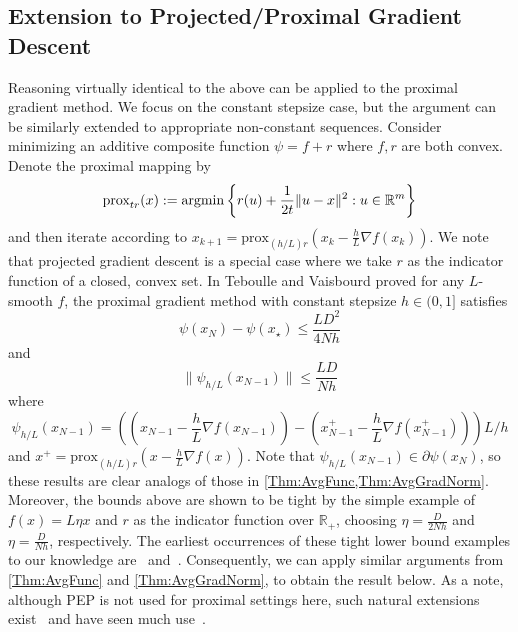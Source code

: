 \documentclass[11pt]{article}
\numberwithin{equation}{section}
\newcommand{\R}{\mathbb{R}}
\newcommand{\prox}{\text{prox}}
\newcommand{\argmin}{\operatornamewithlimits{argmin}}
\theoremstyle{definition}
\theoremstyle{definition}
\theoremstyle{definition}
\newcommand{\1}{\mathbf{1}}
\newcommand{\xStar}{x_\star}
\newcommand{\dimension}{m}
\begin{document}
\subsection{Extension to Projected/Proximal Gradient Descent}
    Reasoning virtually identical to the above can be applied to the proximal gradient method. We focus on the constant stepsize case, but the argument can be similarly extended to appropriate non-constant sequences. Consider minimizing an additive composite function $\psi = f +r $ where $f,r$ are both convex. Denote the proximal mapping by 
    \begin{equation*}
        \prox_{t r}(x) := \argmin \left\{r(u) + \frac{1}{2t}\|u-x\|^2: u \in \R^\dimension \right\}
    \end{equation*}
    and then iterate according to $x_{k+1}=\mathrm{prox}_{(h/L) r} (x_k-\frac{h}{L}\nabla f(x_k))$. We note that projected gradient descent is a special case where we take $r$ as the indicator function of a closed, convex set. In \cite[Theorem 7]{Teboulle_4T_Analytical} Teboulle and Vaisbourd proved for any $L$-smooth $f$, the proximal gradient method with constant stepsize $h \in (0,1]$ satisfies
    \begin{equation*}
        \psi(x_N) - \psi(\xStar) \leq \frac{LD^2}{4Nh}
    \end{equation*}
    and
    \begin{equation*}
       \|\psi_{h/L}(x_{N-1}) \| \leq \frac{LD}{Nh}
    \end{equation*}
    where $$\psi_{h/L}(x_{N-1}) = \left((x_{N-1} - \frac{h}{L}\nabla f(x_{N-1})) - (x_{N-1}^+ -\frac{h}{L} \nabla f(x_{N-1}^+))\right)L/h$$ and $x^+ = \mathrm{prox}_{(h/L)r} \left(x - \frac{h}{L}\nabla f(x) \right)$. Note that $\psi_{h/L}(x_{N-1}) \in \partial \psi(x_N)$, so these results are clear analogs of those in \cref{Thm:AvgFunc,Thm:AvgGradNorm}. Moreover, the bounds above are shown to be tight by the simple example of $f(x) = L \eta x$ and $r$ as the indicator function over $\R_+$, choosing $\eta = \frac{D}{2Nh}$ and $\eta = \frac{D}{Nh}$, respectively. The earliest occurrences of these tight lower bound examples to our knowledge are~\cite[Appendix 2.8]{Drori2014} and~\cite[Section 4]{Interpolation}.
    Consequently, we can apply similar arguments from \cref{Thm:AvgFunc} and \cref{Thm:AvgGradNorm}, to obtain the result below. As a note, although PEP is not used for proximal settings here, such natural extensions exist~\cite{Interpolation2} and have seen much use~\cite{Barre2023,pepit2022,Gu2020,Kim2021}.
\end{document}
